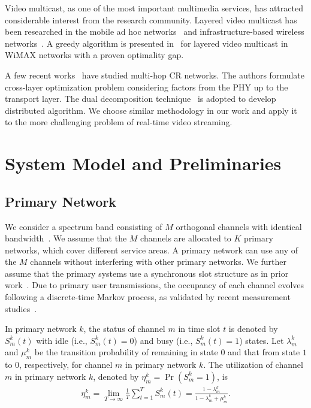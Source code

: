 \documentclass[12pt,onecolumn,draftclsnofoot]{IEEEtran} %
\begin{document}
Video multicast, as one of the most important multimedia services, has attracted considerable interest from the research community. Layered video multicast has been researched in the mobile ad hoc networks~\cite{Mao06,Wei07} and infrastructure-based wireless networks~\cite{Deb08,Schaar03}. A greedy algorithm is presented in~\cite{Deb08} for layered video multicast in WiMAX networks with a proven optimality gap.

A few recent works~\cite{Hou07,Hou08,Feng09} have studied multi-hop CR networks. The authors formulate cross-layer optimization problem considering factors from the PHY up to the transport layer. The dual decomposition technique~\cite{Palomar06, Bertsekas99} is adopted to develop distributed algorithm. We choose similar methodology in our work and apply it to the more challenging problem of real-time video streaming. 

\section{System Model and Preliminaries}\label{sec:cr_video_sys}
%
\subsection{Primary Network}

We consider a spectrum band consisting of $M$ orthogonal channels with identical bandwidth~\cite{Jia08,Hu11MC}. We assume that the $M$ channels are allocated to $K$ primary networks, which cover different service areas. A primary network can use any of the $M$ channels without interfering with other primary networks.  We further assume that the primary systems use a synchronous slot structure as in prior work~\cite{Zhao07a, Su08}.  Due to primary user transmissions, the occupancy of each channel evolves following a discrete-time Markov process, as validated by recent measurement studies~\cite{Zhao07a, Su08, Motamedi07}.  


In primary network $k$, the status of channel $m$ in time slot $t$ is denoted by $S_m^k(t)$ with idle (i.e., $S_m^k(t)=0$) and busy (i.e., $S_m^k(t)=1$) states.  Let $\lambda_m^k$ and $\mu_m^k$ be the transition probability of remaining in state $0$ and that from state $1$ to $0$, respectively, for channel $m$ in primary network $k$. The utilization of channel $m$ in primary network $k$, denoted by $\eta_m^k = \Pr(S_m^k=1)$, is
\begin{eqnarray}\label{eq:ProbBusy1}
  \eta_m^k = \lim_{T \to \infty} \frac{1}{T} 
             \mbox{$\sum_{t=1}^T$} S_m^k(t) 
           = \frac{1-\lambda_m^k}{1-\lambda_m^k+\mu_m^k}.
\end{eqnarray}
\end{document}
